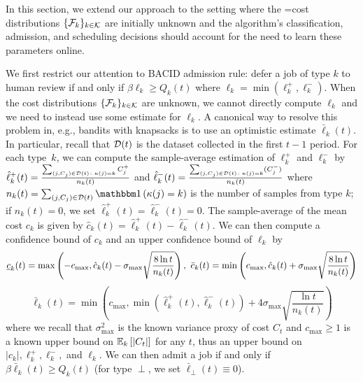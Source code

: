 In this section, we extend our approach to the setting where the =cost distributions $\{\mathcal{F}_k\}_{k \in \mathcal{K}}$ are initially unknown and the algorithm's classification, admission, and scheduling decisions should account for the need to learn these parameters online.

We first restrict our attention to \textsc{BACID}
admission rule: defer a job of type $k$ to human review if and only if $\beta \ell_k \geq Q_k(t)$ where $\ell_k = \min(\ell_k^+,\ell_k^-)$. When the cost distributions $\{\mathcal{F}_k\}_{k \in \mathcal{K}}$ are unknown, we cannot directly compute $\ell_k$ and we need to instead use some estimate for $\ell_k$. A canonical way to resolve this problem in, e.g., bandits with knapsacks \citep{agrawal2019bandits} is to use an optimistic estimate $\bar{\ell}_k(t)$. In particular, recall that $\mathcal{D}(t)$ is the dataset collected in the first $t-1$ period. For each type~$k$, we can compute the sample-average estimation of $\ell_k^{+}$ and $\ell_k^{-}$ by $\hat{\ell}_k^+(t)=\frac{\sum_{(j,C_j)\in \mathcal{D}(t) \colon \kappa(j) = k} C^+_j}{n_k(t)}$ and $\hat{\ell}_k^-(t)=\frac{\sum_{(j,C_j)\in \mathcal{D}(t) \colon \kappa(j) = k} (C^-_j)}{n_k(t)}$ where  $n_k(t) = \sum_{(j,C_j) \in \set{D}(t)} \indic{\kappa(j)=k}$ is the number of samples from type $k$; if $n_k(t)=0$, we set $\hat{\ell}_k^+(t)=\hat{\ell}_k^-(t) = 0$. The sample-average of the mean cost $c_k$ is given by $\hat{c}_k(t) = \hat{\ell}_k^+(t) - \hat{\ell}_k^-(t)$. We can then compute a confidence bound of $c_k$ and an upper confidence bound of $\ell_k$ by
\begin{equation}\label{eq:conf-h}
\underline{c}_k(t) = \max\left(-c_{\max},\hat{c}_k(t) - \sigma_{\max}\sqrt{\frac{8\ln t}{n_k(t)}}\right),~\bar{c}_k(t) = \min\left(c_{\max},\hat{c}_k(t) + \sigma_{\max}\sqrt{\frac{8\ln t}{n_k(t)}}\right)
\end{equation}
\begin{equation}\label{eq:conf-r}
\bar{\ell}_k(t) = \min\left(c_{\max},\min\left(\hat{\ell}_k^+(t), \hat{\ell}_k^-(t)\right) + 4\sigma_{\max}\sqrt{\frac{\ln t}{n_k(t)}}\right)
\end{equation}
where we recall that $\sigma_{\max}^2$ is the known variance proxy of cost $C_t$ and $c_{\max} \geq 1$ is a known upper bound on $\mathbb E_{k}\left[|C_t|\right]$ for any $t$, thus an upper bound on $|c_k|,\ell_k^{+}, \ell_k^{-},$ and $\ell_k$. We can then admit a job if and only if $\beta \bar{\ell}_k(t) \geq Q_k(t)$ (for type $\perp$, we set $\bar{\ell}_{\perp}(t) \equiv 0$). 

